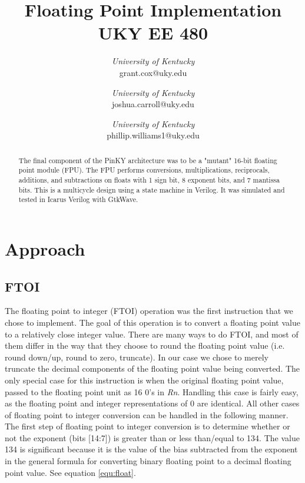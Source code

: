\documentclass[conference]{IEEEtran}
\begin{document}
\title{Floating Point Implementation\\
    UKY EE 480}

\author{
\textit{University of Kentucky}\\
grant.cox@uky.edu
\and
{}
\textit{University of Kentucky}\\
joshua.carroll@uky.edu
\and
{}
\textit{University of Kentucky}\\
phillip.williams1@uky.edu}

\maketitle

\begin{abstract}
    The final component of the PinKY architecture was to be a "mutant" 16-bit floating point module (FPU). The FPU performs conversions, multiplications, reciprocals, additions, and subtractions on floats with 1 sign bit, 8 exponent bits, and 7 mantissa bits. This is a multicycle design using a state machine in Verilog. It was simulated and tested in Icarus Verilog with GtkWave.
\end{abstract}

\section{Approach}
    \subsection{FTOI}
    The floating point to integer (FTOI) operation was the first instruction that we chose to implement. The goal of this operation is to convert a floating point value to a relatively close integer value. There are many ways to do FTOI, and most of them differ in the way that they choose to round the floating point value (i.e. round down/up, round to zero, truncate). In our case we chose to merely truncate the decimal components of the floating point value being converted. The only special case for this instruction is when the original floating point value, passed to the floating point unit as 16 0's in \textit{Rn}. Handling this case is fairly easy, as the floating point and integer representations of 0 are identical. All other cases of floating point to integer conversion can be handled in the following manner. The first step of floating point to integer conversion is to determine whether or not the exponent (bits [14:7]) is greater than or less than/equal to 134. The value 134 is significant because it is the value of the bias subtracted from the exponent in the general formula for converting binary floating point to a decimal floating point value. See equation \ref{equ:float}.
    
\end{document}
